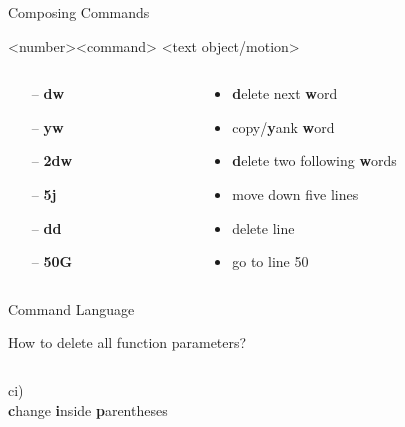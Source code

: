 \documentclass{beamer}
\begin{document}
\begin{frame}{Composing Commands}
    \begin{center}
        \large \textless number\textgreater \textless command\textgreater
        \textless text object/motion\textgreater
    \end{center}
    \begin{columns}
        \begin{column}{0.2\textwidth}
            \begin{itemize}
                \item[--] \textbf{dw}
                \item[--] \textbf{yw}
                \item[--] \textbf{2dw}
                \item[--] \textbf{5j}
                \item[--] \textbf{dd}
                \item[--] \textbf{50G}
            \end{itemize}
        \end{column}
        \begin{column}{0.5\textwidth}
            \begin{itemize}
                \item \textbf{d}elete next \textbf{w}ord
                \item copy/\textbf{y}ank \textbf{w}ord
                \item \textbf{d}elete two following \textbf{w}ords
                \item move down five lines
                \item delete line
                \item go to line 50
            \end{itemize}
        \end{column}
    \end{columns}
\end{frame}

\begin{frame}{Command Language}
    \begin{block}{How to delete all function parameters?}
    \end{block}
    \inputminted{js}{codes/changeInsideParentheses.js}
    \pause
    \begin{center}
        \huge
        ci)
        \\
        \textbf{c}hange \textbf{i}nside \textbf{p}arentheses
    \end{center}
\end{frame}
\end{document}

